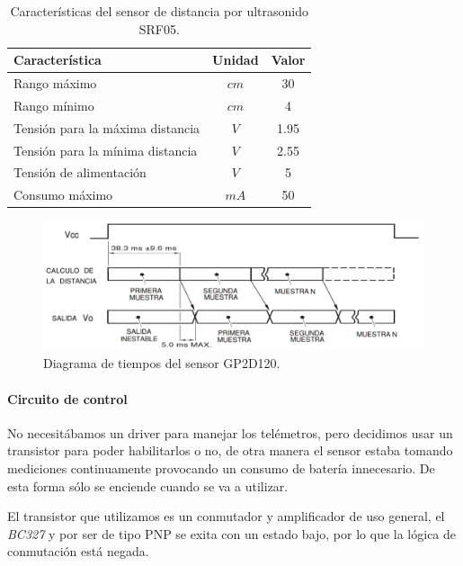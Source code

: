 \begin{table}[ht]
	\begin{center}
		\begin{tabular}{|l|c|c|}
			\hline
			Caracter\'istica & Unidad & Valor\\
			\hline
			Rango m\'aximo & $cm$ & 30 \\
			Rango m\'inimo & $cm$ & 4 \\
			Tensi\'on para la m\'axima distancia & $V$ & 1.95 \\
			Tensi\'on para la m\'inima distancia & $V$ & 2.55 \\
			Tensi\'on de alimentaci\'on & $V$ & 5 \\
			Consumo m\'aximo & $mA$ & 50 \\
			\hline
		\end{tabular}
	\end{center}
	\caption{Caracter\'isticas del sensor de distancia por ultrasonido SRF05.}
	\label{hT_gp2d120}
\end{table}

\begin{figure}[ht]
	\centering
	\includegraphics[scale=0.25]{figuras/gp2d120_pulse.png}
	\caption{Diagrama de tiempos del sensor GP2D120.}
	\label{hF_gp2d120_pulse}
\end{figure}

\paragraph{Circuito de control}
\label{h_sensado_telemetros_circuito}

No necesit\'abamos un driver para manejar los tel\'emetros, pero decidimos usar un transistor para poder habilitarlos o no,
de otra manera el sensor estaba tomando mediciones continuamente provocando un consumo de bater\'ia innecesario.
De esta forma s\'olo se enciende cuando se va a utilizar.

El transistor que utilizamos es un conmutador y amplificador de uso general, el \emph{BC327} y por ser de tipo PNP se
exita con un estado bajo, por lo que la l\'ogica de conmutaci\'on est\'a negada.

